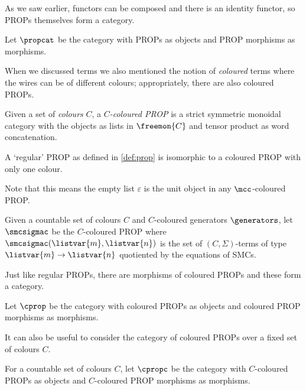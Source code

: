 As we saw earlier, functors can be composed and there is an identity functor,
so PROPs themselves form a category.

\begin{definition}
    Let \(\propcat\) be the category with PROPs as objects and PROP morphisms
    as morphisms.
\end{definition}

When we discussed terms we also mentioned the notion of \emph{coloured} terms
where the wires can be of different colours; appropriately, there are also
coloured PROPs.

\begin{definition}
    Given a set of \emph{colours} \(C\), a \emph{\(C\)-coloured PROP} is a strict
    symmetric monoidal category with the objects as lists in \(\freemon{C}\) and
    tensor product as word concatenation.
\end{definition}

\begin{remark}
    A `regular' PROP as defined in \cref{def:prop} is isomorphic to a
    coloured PROP with only one colour.
\end{remark}

Note that this means the empty list \(\varepsilon\) is the unit
object in any \(\mcc\)-coloured PROP.

\begin{definition}\label{def:freely-generated-coloured-prop}
    Given a countable set of colours \(C\) and \(C\)-coloured generators
    \(\generators\), let \(\smcsigmac\) be the \(C\)-coloured PROP where
    \(\smcsigmac(\listvar{m}, \listvar{n})\) is the set of
    \((C,\Sigma)\)-terms of type \(\listvar{m} \to \listvar{n}\) quotiented by
    the equations of SMCs.
\end{definition}

Just like regular PROPs, there are morphisms of coloured PROPs and these form
a category.

\begin{definition}
    Let \(\cprop\) be the category with coloured PROPs as objects and coloured
    PROP morphisms as morphisms.
\end{definition}

It can also be useful to consider the category of coloured PROPs over a fixed
set of colours \(C\).

\begin{definition}
    For a countable set of colours \(C\), let \(\cpropc\) be the category with
    \(C\)-coloured PROPs as objects and \(C\)-coloured PROP morphisms as
    morphisms.
\end{definition}